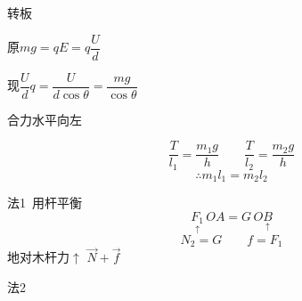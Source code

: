 \begin{problem}[4]
转板
\begin{solution}
原\quad $mg=qE=q\dfrac{U}{d}$

现\quad $\dfrac{U}{d}q=\dfrac{U}{d\cos\theta}=\dfrac{mg}{\cos\theta}$ %

合力水平向左
\end{solution}
\end{problem}
\begin{problem}[5]
\begin{solution}
\[ \frac{T}{l_1}=\frac{m_1g}{h}\qquad\frac{T}{l_2}=\frac{m_2g}{h} \]
\[ \therefore m_1l_1=m_2l_2 \]
\end{solution}
\end{problem}
\begin{problem}[6]
\begin{solution}
法1\ 用杆平衡 %
\[ \underset{\uparrow}{F_1}\,OA=G\,O\underset{\uparrow}{B} \] %
\[ N_2=G\qquad f=F_1 \]
地对木杆力$\uparrow$ $\vec N+\vec f$


法2\  %
\end{solution}
\end{problem}
